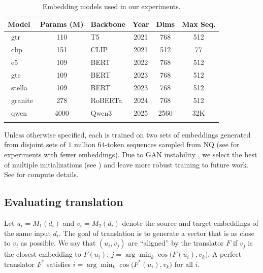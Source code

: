 \begin{table}[ht]
  \scriptsize
  \centering
  \begin{tabular}{lclccc}
    \toprule
    Model    & Params (M) & Backbone & Year & Dims & Max Seq. \\
    \midrule
    \citep{ni2021gtr} \ gtr      & 110     & T5 & 2021 & 768 & 512  \\
    \citep{radford2021clip} \ clip    & 151     & CLIP & 2021 & 512 & 77  \\
    \citep{wang2024e5} \ e5     & 109     & BERT & 2022 & 768 & 512 \\
    \citep{li2023gte} \ gte    & 109     & BERT & 2023 & 768 & 512 \\
    \citep{zhang2025stella} \ stella & 109     & BERT & 2023 & 768 & 512 \\
    \citep{granite2024embedding} \ granite  & 278     & RoBERTa & 2024 & 768 & 512 \\
    \cite{qwen3embedding} \ qwen & 4000 & Qwen3 & 2025 & 2560 & 32K\\
    \bottomrule\\[-1.6ex]
  \end{tabular}
  \caption{Embedding models used in our experiments.}
  \label{tab:model-specs}
\end{table}

Unless otherwise specified, each \atk{} is trained on two sets of embeddings generated from disjoint sets of $1$ million $64$-token sequences sampled from NQ (see  for experiments with fewer embeddings).  Due to GAN instability \cite{10.1145/3446374}, we select the best of multiple initializations (see ) and leave more robust training to future work. See  for compute details.


\subsection{Evaluating translation}
\label{sec:ot}

Let $u_i = M_1(d_i)$ and $v_i = M_2(d_i)$ denote the source and target embeddings of the same input $d_i$.  The goal of translation is to generate a vector that is as close to $v_i$ as possible.  We say that \((u_i, v_j)\) are ``aligned'' by the translator \(F\) if \(v_j\) is the closest embedding to \(F(u_i)\): $j = \arg\min_k \cos\bigl(F(u_i), v_k\bigr).$
A perfect translator \(F^*\) satisfies \(i = \arg\min_k \cos\bigl(F^*(u_i), v_k\bigr)\) for all \(i\).


